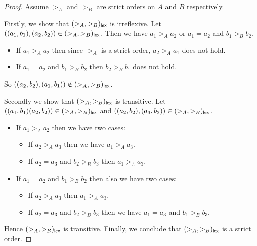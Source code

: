 \documentclass[autodetect-enginem]{article}
\theoremstyle{plain}
\theoremstyle{definition}
\theoremstyle{definition}
\begin{document}
\begin{proof}
    Assume $>_A$ and $>_B$ are strict orders on $A$ and $B$ respectively.
    
    Firstly, we show that $(>_A, >_B)_{\mathsf{lex}}$ is irreflexive.
    Let $((a_1, b_1), (a_2,b_2)) \in (>_A, >_B)_{\mathsf{lex}}$.
    Then we have $a_1 >_A a_2$ or $a_1 = a_2$ and $b_1 >_B b_2$.
        \begin{itemize}
            \item If $a_1 >_A a_2$ then since $>_A$ is a strict order, $a_2 >_A a_1$ does not hold.
            \item If $a_1 = a_2$ and $b_1 >_B b_2$ then $b_2 >_B b_1$ does not hold.
        \end{itemize}
        So $((a_2, b_2), (a_1, b_1)) \notin (>_A, >_B)_{\mathsf{lex}}$. 
   
    Secondly we show that $(>_A, >_B)_{\mathsf{lex}}$ is transitive.
    Let $((a_1, b_1) (a_2, b_2)) \in (>_A, >_B)_{\mathsf{lex}}$ and $((a_2, b_2), (a_3, b_3)) \in (>_A, >_B)_{\mathsf{lex}}$.
    \begin{itemize}
        \item If $a_1 >_A a_2$ then we have two cases:
            \begin{itemize}
                \item If $a_2 >_A a_3$ then we have $a_1 >_A a_3$.
                \item If $a_2 = a_3$ and $b_2 >_B b_3$ then $a_1 >_A a_3$.
            \end{itemize}
        \item If $a_1 = a_2$ and $b_1 >_B b_2$ then also we have two cases:
            \begin{itemize}
                \item If $a_2 >_A a_3$ then $a_1 >_A a_3$.
                \item If $a_2 = a_3$ and $b_2 >_B b_3$ then we have $a_1 = a_3$ and $b_1 >_B b_3$.
            \end{itemize}
    \end{itemize}
    Hence $(>_A, >_B)_{\mathsf{lex}}$ is transitive.
    Finally, we conclude that $(>_A, >_B)_{\mathsf{lex}}$ is a strict order.
    
\end{proof}
\end{document}
